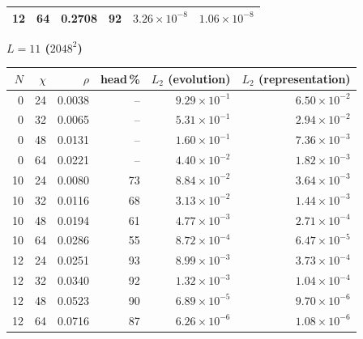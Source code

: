 {\begin{tabular}{rrrrrr}
12 & 64 & 0.2708 & 92 & $3.26\times10^{-8}$ & $1.06\times10^{-8}$\\
\bottomrule
\end{tabular}
\vspace{6pt}
\textbf{$L=11$ ($2048^2$)}\\[2pt]
\begin{tabular}{rrrrrr}
\toprule
$N$ & $\chi$ & $\rho$ & head\,\% & $L_2$ (evolution) & $L_2$ (representation)\\
\midrule
0 & 24 & 0.0038 & -- & $9.29\times10^{-1}$ & $6.50\times10^{-2}$\\
0 & 32 & 0.0065 & -- & $5.31\times10^{-1}$ & $2.94\times10^{-2}$\\
0 & 48 & 0.0131 & -- & $1.60\times10^{-1}$ & $7.36\times10^{-3}$\\
0 & 64 & 0.0221 & -- & $4.40\times10^{-2}$ & $1.82\times10^{-3}$\\
10 & 24 & 0.0080 & 73 & $8.84\times10^{-2}$ & $3.64\times10^{-3}$\\
10 & 32 & 0.0116 & 68 & $3.13\times10^{-2}$ & $1.44\times10^{-3}$\\
10 & 48 & 0.0194 & 61 & $4.77\times10^{-3}$ & $2.71\times10^{-4}$\\
10 & 64 & 0.0286 & 55 & $8.72\times10^{-4}$ & $6.47\times10^{-5}$\\
12 & 24 & 0.0251 & 93 & $8.99\times10^{-3}$ & $3.73\times10^{-4}$\\
12 & 32 & 0.0340 & 92 & $1.32\times10^{-3}$ & $1.04\times10^{-4}$\\
12 & 48 & 0.0523 & 90 & $6.89\times10^{-5}$ & $9.70\times10^{-6}$\\
12 & 64 & 0.0716 & 87 & $6.26\times10^{-6}$ & $1.08\times10^{-6}$\\
\bottomrule
\end{tabular}
\vspace{6pt}}

\newcommand{\TabBudgetSaving}{%
\begin{tabular}{rrrrr}
\toprule
target $L_2$ & $L=8$ & $L=9$ & $L=10$ & $L=11$\\
\midrule
$1\times10^{-1}$ & 1.4 ($N{=}6$) & 2.3 ($N{=}8$) & 1.9 ($N{=}8$) & --\\
$6\times10^{-2}$ & 2.3 ($N{=}8$) & 2.1 ($N{=}8$) & 1.8 ($N{=}8$) & 2.1 ($N{=}10$)\\
$3\times10^{-2}$ & 2.5 ($N{=}8$) & -- & 2.1 ($N{=}10$) & --\\
$1\times10^{-2}$ & 2.4 ($N{=}8$) & -- & 2.1 ($N{=}10$) & --\\
$3\times10^{-3}$ & -- & -- & -- & --\\
\bottomrule
\end{tabular}}

